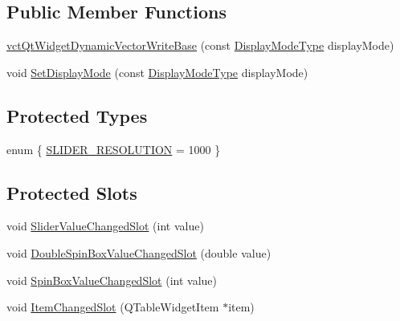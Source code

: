 \subsection*{Public Member Functions}
\begin{DoxyCompactItemize}
\item 
\hyperlink{classvct_qt_widget_dynamic_vector_write_base_a49b15da333730edfad46b2328a348584}{vct\-Qt\-Widget\-Dynamic\-Vector\-Write\-Base} (const \hyperlink{classvct_qt_widget_dynamic_vector_write_base_aefbf6a51f1009f060305c2b5e106cf02}{Display\-Mode\-Type} display\-Mode)
\item 
void \hyperlink{classvct_qt_widget_dynamic_vector_write_base_a19cef1a736f0414393788ccf7b58175f}{Set\-Display\-Mode} (const \hyperlink{classvct_qt_widget_dynamic_vector_write_base_aefbf6a51f1009f060305c2b5e106cf02}{Display\-Mode\-Type} display\-Mode)
\end{DoxyCompactItemize}
\subsection*{Protected Types}
\begin{DoxyCompactItemize}
\item 
enum \{ \hyperlink{classvct_qt_widget_dynamic_vector_write_base_a2bae677048cad1441ab937cb78737743ab508a86bc91e13c000f3634a96f7b44f}{S\-L\-I\-D\-E\-R\-\_\-\-R\-E\-S\-O\-L\-U\-T\-I\-O\-N} = 1000
 \}
\end{DoxyCompactItemize}
\subsection*{Protected Slots}
\begin{DoxyCompactItemize}
\item 
void \hyperlink{classvct_qt_widget_dynamic_vector_write_base_a850f1037fe95f4d8467313d7713b1d0d}{Slider\-Value\-Changed\-Slot} (int value)
\item 
void \hyperlink{classvct_qt_widget_dynamic_vector_write_base_aad8ccc0aba1b519bdfff00a5a5e88586}{Double\-Spin\-Box\-Value\-Changed\-Slot} (double value)
\item 
void \hyperlink{classvct_qt_widget_dynamic_vector_write_base_a41430617cff519ef7e20b5e19f412266}{Spin\-Box\-Value\-Changed\-Slot} (int value)
\item 
void \hyperlink{classvct_qt_widget_dynamic_vector_write_base_a112558c2b4bc69ace11c8fc59534ddce}{Item\-Changed\-Slot} (Q\-Table\-Widget\-Item $\ast$item)
\end{DoxyCompactItemize}
